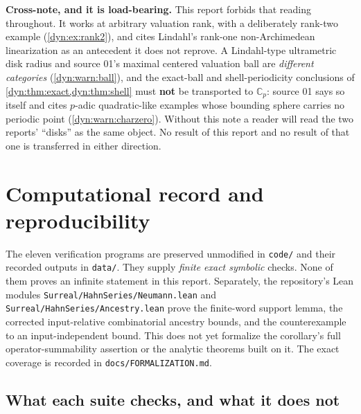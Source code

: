 \documentclass[11pt,letterpaper]{article}
\theoremstyle{definition}
\theoremstyle{remark}
\newcommand{\C}{\mathbb C}
\numberwithin{equation}{section}
\begin{document}
\textbf{Cross-note, and it is load-bearing.} This report forbids that
reading throughout. It works at arbitrary valuation rank, with a
deliberately rank-two example (\cref{dyn:ex:rank2}), and cites Lindahl's
rank-one non-Archimedean linearization as an antecedent it does not
reprove. A Lindahl-type ultrametric disk radius and source 01's maximal
centered valuation ball are \emph{different categories}
(\cref{dyn:warn:ball}), and the exact-ball and shell-periodicity
conclusions of \cref{dyn:thm:exact,dyn:thm:shell} must \textbf{not} be
transported to $\C_p$: source 01 says so itself and cites $p$-adic
quadratic-like examples whose bounding sphere carries no periodic point
(\cref{dyn:warn:charzero}). Without this note a reader will read the two
reports' ``disks'' as the same object. No result of this report and no
result of that one is transferred in either direction.

\section{Computational record and reproducibility}
\label{dyn:sec:verification}

The eleven verification programs are preserved unmodified in \texttt{code/}
and their recorded outputs in \texttt{data/}. They supply \emph{finite
exact symbolic} checks. None of them proves an infinite statement in
this report. Separately, the repository's Lean modules
\texttt{Surreal/HahnSeries/Neumann.lean} and
\texttt{Surreal/HahnSeries/Ancestry.lean} prove the finite-word support
lemma, the corrected input-relative combinatorial ancestry bounds, and the
counterexample to an input-independent bound. This does not yet formalize
the corollary's full operator-summability assertion or the analytic
theorems built on it. The exact coverage is recorded in
\texttt{docs/FORMALIZATION.md}.

\subsection{What each suite checks, and what it does not}
\end{document}
